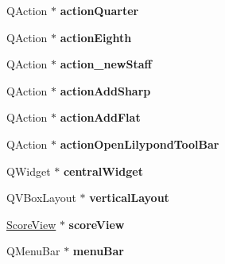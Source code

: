 \begin{DoxyCompactItemize}
\item 
\hypertarget{class_ui___main_window_a5bbd123670a59da0234403b38e1ce62c}{}Q\+Action $\ast$ {\bfseries action\+Quarter}\label{class_ui___main_window_a5bbd123670a59da0234403b38e1ce62c}

\item 
\hypertarget{class_ui___main_window_a38ee963791699d1a84f733ba782f6af9}{}Q\+Action $\ast$ {\bfseries action\+Eighth}\label{class_ui___main_window_a38ee963791699d1a84f733ba782f6af9}

\item 
\hypertarget{class_ui___main_window_a934f7de690dc173f43029e55cd7cdc1d}{}Q\+Action $\ast$ {\bfseries action\+\_\+new\+Staff}\label{class_ui___main_window_a934f7de690dc173f43029e55cd7cdc1d}

\item 
\hypertarget{class_ui___main_window_af635c6cec0277bea83103f2f1cb3a16d}{}Q\+Action $\ast$ {\bfseries action\+Add\+Sharp}\label{class_ui___main_window_af635c6cec0277bea83103f2f1cb3a16d}

\item 
\hypertarget{class_ui___main_window_a415d4748922437c9d9f5affe9e2e5362}{}Q\+Action $\ast$ {\bfseries action\+Add\+Flat}\label{class_ui___main_window_a415d4748922437c9d9f5affe9e2e5362}

\item 
\hypertarget{class_ui___main_window_ab02a56ba9d54cf040591d4de32651b94}{}Q\+Action $\ast$ {\bfseries action\+Open\+Lilypond\+Tool\+Bar}\label{class_ui___main_window_ab02a56ba9d54cf040591d4de32651b94}

\item 
\hypertarget{class_ui___main_window_a30075506c2116c3ed4ff25e07ae75f81}{}Q\+Widget $\ast$ {\bfseries central\+Widget}\label{class_ui___main_window_a30075506c2116c3ed4ff25e07ae75f81}

\item 
\hypertarget{class_ui___main_window_aecd96a04789fcfec3f98d80390ad8184}{}Q\+V\+Box\+Layout $\ast$ {\bfseries vertical\+Layout}\label{class_ui___main_window_aecd96a04789fcfec3f98d80390ad8184}

\item 
\hypertarget{class_ui___main_window_a640fd28680d98c59f110e1d5e9f0ffb2}{}\hyperlink{class_score_view}{Score\+View} $\ast$ {\bfseries score\+View}\label{class_ui___main_window_a640fd28680d98c59f110e1d5e9f0ffb2}

\item 
\hypertarget{class_ui___main_window_a2be1c24ec9adfca18e1dcc951931457f}{}Q\+Menu\+Bar $\ast$ {\bfseries menu\+Bar}\label{class_ui___main_window_a2be1c24ec9adfca18e1dcc951931457f}


\end{DoxyCompactItemize}
